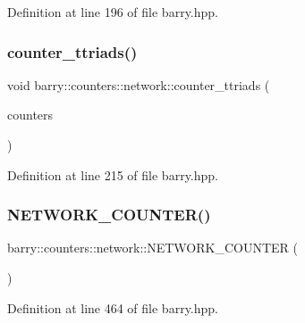 Definition at line 196 of file barry.\+hpp.

\mbox{\label{namespacebarry_1_1counters_1_1network_ab3a9cd11d47c9c1d5652c28d139047c8}} 
\subsubsection{\texorpdfstring{counter\+\_\+ttriads()}{counter\_ttriads()}}
{\footnotesize\ttfamily void barry\+::counters\+::network\+::counter\+\_\+ttriads (\begin{DoxyParamCaption}\item[{\hyperlink{namespacebarry_1_1counters_1_1network_a3b3c590303d47840d1967372ae495d95}{Net\+Counter\+Vector} $\ast$}]{counters }\end{DoxyParamCaption})\hspace{0.3cm}{\ttfamily [inline]}}



Definition at line 215 of file barry.\+hpp.

\mbox{\label{namespacebarry_1_1counters_1_1network_a7649cd035af193258a69058aea425941}} 
\subsubsection{\texorpdfstring{N\+E\+T\+W\+O\+R\+K\+\_\+\+C\+O\+U\+N\+T\+E\+R()}{NETWORK\_COUNTER()}}
{\footnotesize\ttfamily barry\+::counters\+::network\+::\+N\+E\+T\+W\+O\+R\+K\+\_\+\+C\+O\+U\+N\+T\+ER (\begin{DoxyParamCaption}\item[{init\+\_\+single\+\_\+attr}]{ }\end{DoxyParamCaption})}



Definition at line 464 of file barry.\+hpp.

